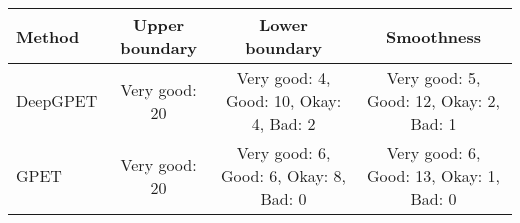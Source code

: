 \begin{tabular}{@{}lccc@{}}
\toprule
Method   & Upper boundary & Lower boundary & Smoothness\\ 
\midrule
DeepGPET & \hspace{0.5em}Very good: 20  \hspace{0.5em}& \hspace{0.5em}Very good: 4, Good: 10, Okay: 4, Bad: 2\hspace{0.5em} & \hspace{0.5em}Very good: 5, Good: 12, Okay: 2, Bad: 1 \\
\acrshort{GPET}     & \hspace{0.5em}Very good: 20  \hspace{0.5em}& \hspace{0.5em}Very good: 6, Good: 6, Okay: 8, Bad: 0\hspace{0.5em}  & \hspace{0.5em}Very good: 6, Good: 13, Okay: 1, Bad: 0 \\ 
\bottomrule
\end{tabular}%

